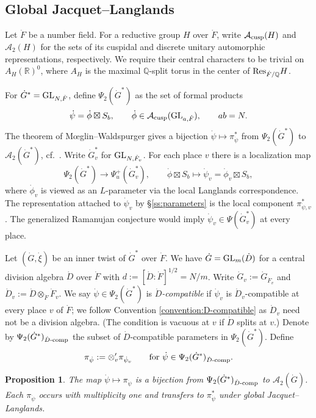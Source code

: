 \documentclass[11pt,reqno]{amsart}
\theoremstyle{plain}
\newtheorem{prop}[thm]{Proposition}
\theoremstyle{definition}
\newcommand{\Q}{\mathbb{Q}}
\newcommand{\R}{\mathbb{R}}
\newcommand{\cA}{\mathcal{A}}
\newcommand{\cusp}{\tu{cusp}}
\newcommand{\GL}{\tu{GL}}
\newcommand{\Res}{\textup{Res}}
\newcommand{\tu}{\textup}
\numberwithin{equation}{subsection}
\begin{document}
\subsection{Global Jacquet--Langlands}\label{ss:globalJL}

Let $\dot F$ be a number field. For a reductive group $H$ over $\dot F$,
write $\cA_{\cusp}(H)$ and $\cA_2(H)$ for the sets of its cuspidal and discrete
unitary automorphic representations, respectively. We require their central characters
to be trivial on $A_H(\R)^0$, where $A_H$ is the maximal $\Q$-split torus in
the center of $\Res_{\dot F/\Q}H$.

For $\dot G^*=\GL_{N,\dot F}$, define $\Psi_2(\dot G^*)$ as the set of
formal products
\[
 \dot\psi=\dot\phi\boxtimes S_b,\qquad
 \dot\phi\in\cA_{\cusp}(\GL_{a,\dot F}),\qquad ab=N.
\]
The theorem of M\oe glin--Waldspurger \cite{MW89} gives a bijection
$\dot\psi\mapsto\pi^*_{\dot\psi}$ from $\Psi_2(\dot G^*)$ to
$\cA_2(\dot G^*)$, cf.~\cite[Thm.~1.3.3]{Arthur}. Write $\dot G_v^*$ for
$\GL_{N,\dot F_v}$. For each place $v$ there is a localization map
\begin{equation}\label{eq:localize-A-parameters}
 \Psi_2(\dot G^*)\longrightarrow\Psi_u^+(\dot G_v^*),\qquad
 \dot\phi\boxtimes S_b\longmapsto
 \dot\psi_v=\dot\phi_v\boxtimes S_b,
\end{equation}
where $\dot\phi_v$ is viewed as an $L$-parameter via the local Langlands
correspondence. The representation attached to $\dot\psi_v$ by
\S\ref{ss:parameters} is the local component $\pi^*_{\dot\psi,v}$.
The generalized Ramanujan conjecture would imply
$\dot\psi_v\in\Psi(\dot G_v^*)$ at every place.

Let $(\dot G,\dot\xi)$ be an inner twist of $\dot G^*$ over $\dot F$. We have $\dot G=\GL_m(\dot D)$ for a central division algebra $\dot D$ over $\dot F$ with $d:=[\dot D:\dot F]^{1/2}=N/m$. Write $\dot G_v:=\dot G_{\dot F_v}$ and $\dot D_v:=\dot D\otimes_{\dot F}\dot F_v$. We say $\dot\psi\in \Psi_2(\dot G^*)$ is \emph{$\dot D$-compatible} if $\dot\psi_v$ is $\dot D_v$-compatible at every place $v$ of $\dot F$; we follow Convention \ref{convention:D-compatible} as $\dot D_v$ need not be a division algebra. (The condition is vacuous at $v$ if $\dot D$ splits at $v$.)
Denote by $\Psi_2(\dot G^*)_{\dot D\tu{-comp}}$ the subset of $\dot D$-compatible parameters in $\Psi_2(\dot G^*)$. Define
\[
\pi_{\dot \psi}:=\otimes'_v \pi_{\dot \psi_v}\qquad \mbox{for}~\dot\psi\in \Psi_2(\dot G^*)_{\dot D\tu{-comp}}.
\]

\begin{prop}\label{prop:global-JL}
The map $\dot\psi\mapsto\pi_{\dot\psi}$ is a bijection from
$\Psi_2(\dot G^*)_{\dot D\tu{-comp}}$ to $\cA_2(\dot G)$.
Each $\pi_{\dot\psi}$ occurs with multiplicity one and transfers to
$\pi^*_{\dot\psi}$ under global Jacquet--Langlands.
\end{prop}
\end{document}
